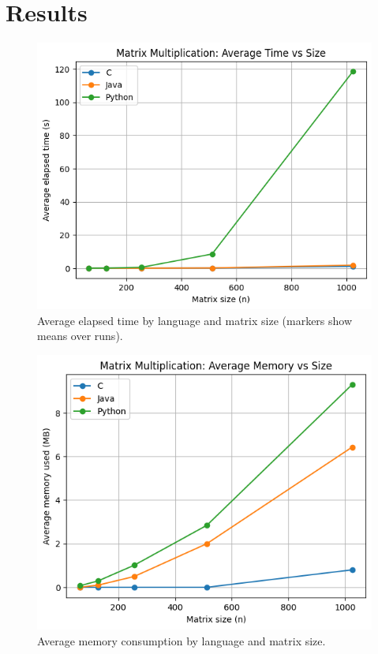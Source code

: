 \documentclass[11pt,a4paper]{article}
\begin{document}
\section{Results}
\begin{figure}[H]
  \centering
  \includegraphics[width=.85\linewidth]{avg_time_by_language.png}
  \caption{Average elapsed time by language and matrix size (markers show means over runs).}
\end{figure}

\begin{figure}[H]
  \centering
  \includegraphics[width=.85\linewidth]{avg_memory_by_language.png}
  \caption{Average memory consumption by language and matrix size.}
\end{figure}
\end{document}
